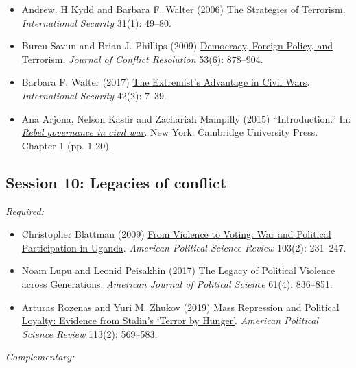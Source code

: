 \documentclass[12pt, a4paper]{article}
\begin{document}
\begin{itemize}
	\item Andrew. H Kydd and Barbara F. Walter (2006) \href{https://doi.org/10.1162/isec.2006.31.1.49}{The Strategies of Terrorism}. \textit{International Security} 31(1): 49--80.
	\item Burcu Savun and Brian J. Phillips (2009) \href{https://doi.org/10.1177/0022002709342978}{Democracy, Foreign Policy, and Terrorism}. \textit{Journal of Conflict Resolution} 53(6): 878--904.
	\item Barbara F. Walter (2017) \href{https://doi.org/10.1162/ISEC_a_00292}{The Extremist’s Advantage in Civil Wars}. \textit{International Security} 42(2): 7--39.
  \item Ana Arjona, Nelson Kasfir and Zachariah Mampilly (2015) ``Introduction.'' In: \href{https://www.cambridge.org/core/books/rebel-governance-in-civil-war/C40247AED4FA30DC2704EB64EA5CFFD5}{\textit{Rebel governance in civil war}}. New York: Cambridge University Press. Chapter 1 (pp. 1-20).
\end{itemize}

\vspace{20pt}
\hline
\subsection*{Session 10: Legacies of conflict}

\noindent\textit{Required:}

\begin{itemize}
  \item Christopher Blattman (2009) \href{https://doi.org/10.1017/S0003055409090212}{From Violence to Voting: War and Political Participation in Uganda}. \textit{American Political Science Review} 103(2): 231--247.
  \item Noam Lupu and Leonid Peisakhin (2017) \href{https://doi.org/10.1111/ajps.12327}{The Legacy of Political Violence across Generations}. \textit{American Journal of Political Science} 61(4): 836--851.
  \item Arturas Rozenas and Yuri M. Zhukov (2019) \href{https://doi.org/10.1017/S0003055419000066}{Mass Repression and Political Loyalty: Evidence from Stalin’s ‘Terror by Hunger’}. \textit{American Political Science Review} 113(2): 569--583.
\end{itemize}

\noindent\textit{Complementary:}
\end{document}
